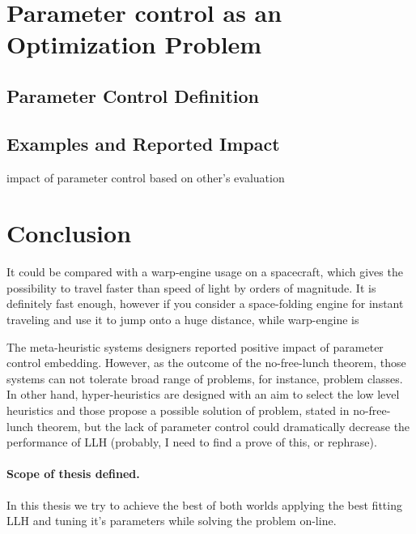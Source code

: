 \section{Parameter control as an Optimization Problem}\label{bg: parameter control}
\subsection{Parameter Control Definition}
\subsection{Examples and Reported Impact}
impact of parameter control based on other's evaluation


\section{Conclusion}


It could be compared with a warp-engine usage on a spacecraft, which gives the possibility to travel faster than speed of light by orders of magnitude. It is definitely fast enough, however if you consider a space-folding engine for instant traveling and use it to jump onto a huge distance, while warp-engine is 


The meta-heuristic systems designers reported positive impact of parameter control embedding. 
However, as the outcome of the no-free-lunch theorem, those systems can not tolerate broad range of problems, for instance, problem classes.
In other hand, hyper-heuristics are designed with an aim to select the low level heuristics and those propose a possible solution of problem, stated in no-free-lunch theorem, but the lack of parameter control could dramatically decrease the performance of LLH (probably, I need to find a prove of this, or rephrase).

\paragraph{Scope of thesis defined.} In this thesis we try to achieve the best of both worlds applying the best fitting LLH and tuning it's parameters while solving the problem on-line.
